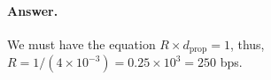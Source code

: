 
\paragraph{Answer.}

We must have the equation \(R \times d_{\text{prop}} = 1\), thus, \(R
= 1/(4 \times 10^{-3}) = 0.25 \times 10^{3} = 250\) bps.
